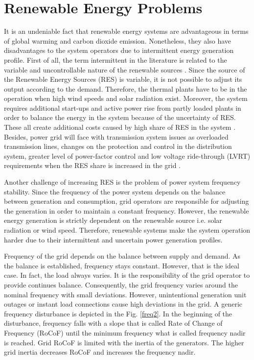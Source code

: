\section{Renewable Energy Problems}
It is an undeniable fact that renewable energy systems are advantageous in terms of global warming and carbon dioxide emission. Nonetheless, they also have disadvantages to the system operators due to intermittent energy generation profile. First of all, the term intermittent in the literature is related to the variable and uncontrollable nature of the renewable sources \cite{KlingeJacobsen2010}. Since the source of the Renewable Energy Sources (RES) is variable, it is not possible to adjust its output according to the demand. Therefore, the thermal plants have to be in the operation when high wind speeds and solar radiation exist. Moreover, the system requires additional start-ups and active power rise from partly loaded plants in order to balance the energy in the system because of the uncertainty of RES. These all create additional costs caused by high share of RES in the system \cite{Zipf2013}. Besides, power grid will face with transmission system issues as overloaded transmission lines, changes on the protection and control in the distribution system, greater level of power-factor control and low voltage ride-through (LVRT) requirements when the RES share is increased in the grid \cite{Ipakchi2009}.\par
Another challenge of increasing RES is the problem of power system frequency stability. Since the frequency of the power system depends on the balance between generation and consumption, grid operators are responsible for adjusting the generation in order to maintain a constant frequency. However, the renewable energy generation is strictly dependent on the renewable source i.e. solar radiation or wind speed. Therefore, renewable systems make the system operation harder due to their intermittent and uncertain power generation profiles. \par 
Frequency of the grid depends on the balance between supply and demand. As the balance is established, frequency stays constant. However, that is the ideal case. In fact, the load always varies. 
It is the responsibility of the grid operator to provide continues balance. Consequently, the grid frequency varies around the nominal frequency with small deviations. However, unintentional generation unit outages or instant load connections cause high deviations in the grid. A generic frequency disturbance is depicted in the Fig. \ref{freq2}. In the beginning of the disturbance, frequency falls with a slope that is called Rate of Change of Frequency (RoCoF) until the minimum frequency what is called frequency nadir is reached. Grid RoCoF is limited with the inertia of the generators. The higher grid inertia decreases RoCoF and increases the frequency nadir. \par
